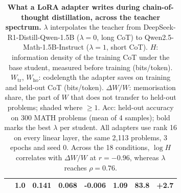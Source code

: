 \begin{table}[t]
\begin{tabular}{llrrrrrr}
 & 1.0 & 0.141 & 0.068 & -0.006 & \cellcolor{gray!20}1.09 & \textbf{83.8} & +2.7 \\
\bottomrule
\end{tabular}
\caption{\textbf{What a LoRA adapter writes during chain-of-thought distillation, across the teacher spectrum.} $\lambda$ interpolates the teacher from DeepSeek-R1-Distill-Qwen-1.5B ($\lambda{=}0$, long CoT) to Qwen2.5-Math-1.5B-Instruct ($\lambda{=}1$, short CoT). $H$: information density of the training CoT under the base student, measured before training (bits/token). $W_{\text{tr}}$, $W_{\text{ho}}$: codelength the adapter saves on training and held-out CoT (bits/token). $\Delta W / W$: memorisation share, the part of $W$ that does not transfer to held-out problems; shaded where $\ge 1$. Acc: held-out accuracy on 300 MATH problems (mean of 4 samples); bold marks the best $\lambda$ per student. All adapters use rank 16 on every linear layer, the same 2{,}113 problems, 3 epochs and seed 0. Across the 18 conditions, $\log H$ correlates with $\Delta W / W$ at $r{=}{-}0.96$, whereas $\lambda$ reaches $\rho{=}0.76$.}
\label{tab:main}
\end{table}
